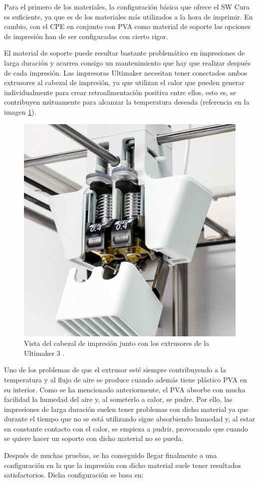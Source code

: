 Para el primero de los materiales, la configuración básica que ofrece el \ac{SW}
Cura es suficiente, ya que es de los materiales más utilizados a la hora de imprimir.
En cambio, con el \ac{CPE} en conjunto con \ac{PVA} como material de soporte las
opciones de impresión han de ser configuradas con cierto rigor.

El material de soporte puede resultar bastante problemático en impresiones de larga
duración y acarrea consigo un mantenimiento que hay que realizar después de cada
impresión. Las impresoras Ultimaker necesitan tener conectados ambos extrusores
al cabezal de impresión, ya que utilizan el calor que pueden generar individualmente
para crear retroalimentación positiva entre ellos, esto es, se contribuyen mútuamente
para alcanzar la temperatura deseada (referencia en la imagen \ref{fig:um3_extruders}).

\begin{figure}[H]
    \centering
    \includegraphics[width=.5\linewidth]{pictures/um3_extruders.png}
    \caption{Vista del cabezal de impresión junto con los extrusores de la Ultimaker 3 \cite{Ultimaker}.}
    \label{fig:um3_extruders}
\end{figure}

Uno de los problemas de que el extrusor esté siempre contribuyendo a la temperatura
y al flujo de aire se produce cuando además tiene plástico \ac{PVA} en su interior.
Como se ha mencionado anteriormente, el \ac{PVA} absorbe con mucha facilidad la humedad
del aire y, al someterlo a calor, se pudre. Por ello, las impresiones de larga duración
suelen tener problemas con dicho material ya que durante el tiempo que no se está
utilizando sigue absorbiendo humedad y, al estar en constante contacto con el calor,
se empieza a pudrir, provocando que cuando se quiere hacer un soporte con dicho material
no se pueda.

Después de muchas pruebas, se ha conseguido llegar finalmente a una configuración en
la que la impresión con dicho material suele tener resultados satisfactorios. Dicha
configuración se basa en:

